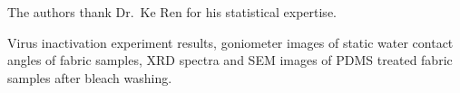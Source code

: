 \documentclass[journal=jacsat,manuscript=article]{achemso}
\begin{document}
\begin{acknowledgement}

The authors thank Dr.~Ke Ren for his statistical expertise. 

\end{acknowledgement}

\begin{suppinfo}

Virus inactivation experiment results, goniometer images of static water contact angles of fabric samples, XRD spectra and SEM images of PDMS treated fabric samples after bleach washing. 


\end{suppinfo}


\end{document}
